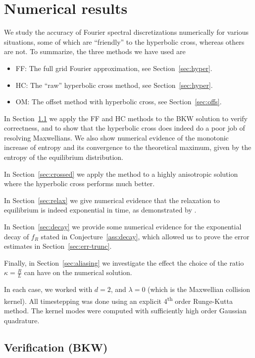 \section{Numerical results} \label{sec:numerical-fou}

We study the accuracy of Fourier spectral discretizations numerically for various
situations, some of which are ``friendly'' to the hyperbolic cross, whereas others
are not. To summarize, the three methods we have used are
\begin{itemize}
    \item FF: The full grid Fourier approximation, see Section~\ref{sec:hyper}.
    \item HC: The ``raw'' hyperbolic cross method, see Section~\ref{sec:hyper}.
    \item OM: The offset method with hyperbolic cross, see Section~\ref{sec:offs}.
\end{itemize}

In Section~\ref{sec:verify} we apply the FF and HC methods to the BKW solution
to verify correctness, and to show that the hyperbolic cross does indeed do a
poor job of resolving Maxwellians. We also show numerical evidence of the
monotonic increase of entropy and its convergence to the theoretical maximum,
given by the entropy of the equilibrium distribution.

In Section~\ref{sec:crossed} we apply the method to a highly anisotropic
solution where the hyperbolic cross performs much better.

In Section~\ref{sec:relax} we give numerical evidence that the
relaxation to equilibrium is indeed exponential in time, as demonstrated by
\cite{Gressman2011gcs}.

In Section~\ref{sec:decay} we provide some numerical evidence for the exponential
decay of $f_R$ stated in Conjecture~\ref{ass:decay}, which allowed us to prove the
error estimates in Section~\ref{sec:err-trunc}.

Finally, in Section~\ref{sec:aliasing} we investigate the effect the choice of
the ratio $\kappa=\frac{R}{L}$ can have on the numerical solution.

In each case, we worked with $d=2$, and $\lambda=0$ (which is the Maxwellian
collision kernel). All timestepping was done using an explicit
4\textsuperscript{th} order Runge-Kutta method. The kernel modes were computed
with sufficiently high order Gaussian quadrature.

\subsection{Verification (BKW)} \label{sec:verify}

